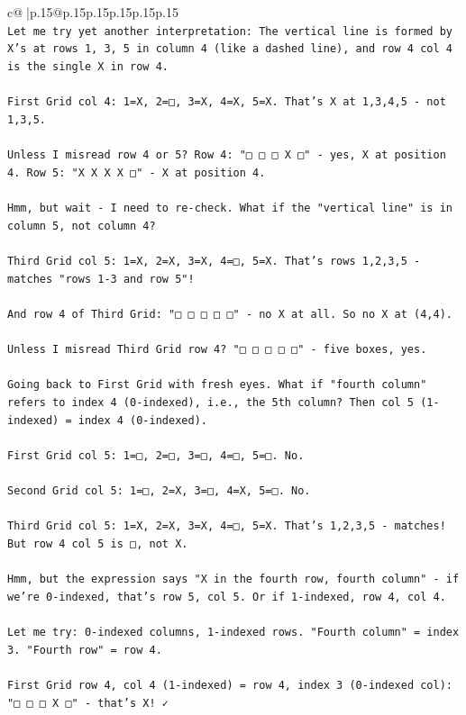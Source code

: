 \documentclass{article}
\begin{document}
{\begin{supertabular}{c@{$\;$}|p{.15\linewidth}@{}p{.15\linewidth}p{.15\linewidth}p{.15\linewidth}p{.15\linewidth}p{.15\linewidth}}
{{{\\ 
\texttt{Let me try yet another interpretation: The vertical line is formed by X's at rows 1, 3, 5 in column 4 (like a dashed line), and row 4 col 4 is the single X in row 4.} \\
\\ 
\texttt{First Grid col 4: 1=X, 2=□, 3=X, 4=X, 5=X. That's X at 1,3,4,5 {-} not 1,3,5.} \\
\\ 
\texttt{Unless I misread row 4 or 5? Row 4: "□ □ □ X □" {-} yes, X at position 4. Row 5: "X X X X □" {-} X at position 4.} \\
\\ 
\texttt{Hmm, but wait {-} I need to re{-}check. What if the "vertical line" is in column 5, not column 4?} \\
\\ 
\texttt{Third Grid col 5: 1=X, 2=X, 3=X, 4=□, 5=X. That's rows 1,2,3,5 {-} matches "rows 1{-}3 and row 5"!} \\
\\ 
\texttt{And row 4 of Third Grid: "□ □ □ □ □" {-} no X at all. So no X at (4,4).} \\
\\ 
\texttt{Unless I misread Third Grid row 4? "□ □ □ □ □" {-} five boxes, yes.} \\
\\ 
\texttt{Going back to First Grid with fresh eyes. What if "fourth column" refers to index 4 (0{-}indexed), i.e., the 5th column? Then col 5 (1{-}indexed) = index 4 (0{-}indexed).} \\
\\ 
\texttt{First Grid col 5: 1=□, 2=□, 3=□, 4=□, 5=□. No.} \\
\\ 
\texttt{Second Grid col 5: 1=□, 2=X, 3=□, 4=X, 5=□. No.} \\
\\ 
\texttt{Third Grid col 5: 1=X, 2=X, 3=X, 4=□, 5=X. That's 1,2,3,5 {-} matches! But row 4 col 5 is □, not X.} \\
\\ 
\texttt{Hmm, but the expression says "X in the fourth row, fourth column" {-} if we're 0{-}indexed, that's row 5, col 5. Or if 1{-}indexed, row 4, col 4.} \\
\\ 
\texttt{Let me try: 0{-}indexed columns, 1{-}indexed rows. "Fourth column" = index 3. "Fourth row" = row 4.} \\
\\ 
\texttt{First Grid row 4, col 4 (1{-}indexed) = row 4, index 3 (0{-}indexed col): "□ □ □ X □" {-} that's X! ✓} \\
}}}
\end{supertabular}}
\end{document}
